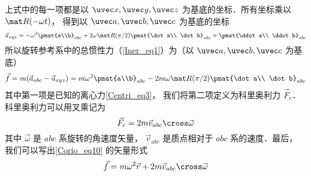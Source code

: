 上式中的每一项都是以 $\uvec x, \uvec y, \uvec z$ 为基底的坐标．所有坐标乘以 $\mat R(-\omega t)$， 得到以 $\uvec a, \uvec b, \uvec c$ 为基底的坐标
\begin{equation}
\vec a_{xyz} =
- \omega^2 \pmat{a\\b}_{abc} + 2\omega \mat R(\pi /2)\pmat{\dot a\\ \dot b}_{abc} + \pmat{\ddot a\\ \ddot b}_{abc}
\end{equation}
所以旋转参考系中的总惯性力（\autoref{Iner_eq1}）为（以 $\uvec a, \uvec b, \uvec c$ 为基底）
\begin{equation}\label{Corio_eq10}
\vec f = m(\vec a_{abc} - \vec a_{xyz})
=  m \omega ^2 \pmat{a\\b}_{abc} - 2m\omega \mat R(\pi /2)\pmat{\dot a\\ \dot b}_{abc}
\end{equation}
其中第一项是已知的离心力\autoref{Centri_eq3}， 我们将第二项定义为科里奥利力 $\vec F_c$． 科里奥利力可以用叉乘记为
\begin{equation}
\vec F_c = 2m \vec v_{abc} \cross \vec \omega
\end{equation}
其中 $\vec\omega$ 是 $abc$ 系旋转的角速度矢量， $\vec v_{abc}$ 是质点相对于 $abc$ 系的速度．最后， 我们可以写出\autoref{Corio_eq10} 的矢量形式
\begin{equation}
\vec f = m \omega ^2 \vec r + 2m \vec v_{abc} \cross \vec \omega 
\end{equation}
 




